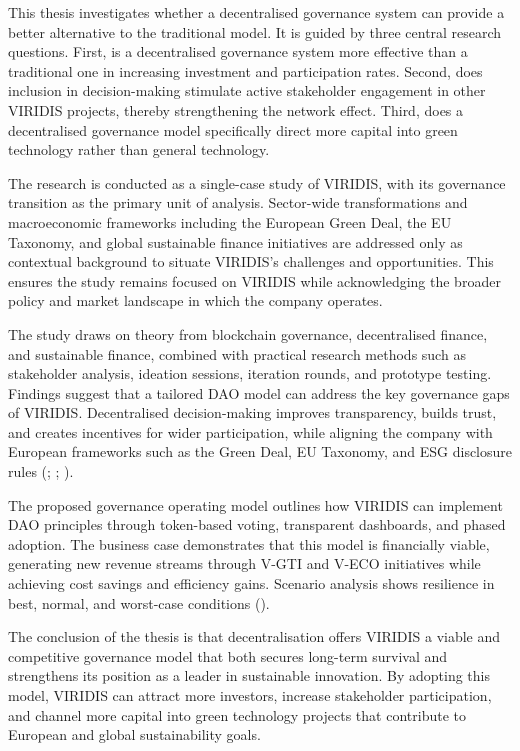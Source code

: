 \documentclass[
  english,
  12pt,
  oneside,
  open=any]{scrbook}
\begin{document}
This thesis investigates whether a decentralised governance system can
provide a better alternative to the traditional model. It is guided by
three central research questions. First, is a decentralised governance
system more effective than a traditional one in increasing investment
and participation rates. Second, does inclusion in decision-making
stimulate active stakeholder engagement in other VIRIDIS projects,
thereby strengthening the network effect. Third, does a decentralised
governance model specifically direct more capital into green technology
rather than general technology.

The research is conducted as a single-case study of VIRIDIS, with its
governance transition as the primary unit of analysis. Sector-wide
transformations and macroeconomic frameworks including the European
Green Deal, the EU Taxonomy, and global sustainable finance initiatives
are addressed only as contextual background to situate VIRIDIS's
challenges and opportunities. This ensures the study remains focused on
VIRIDIS while acknowledging the broader policy and market landscape in
which the company operates.

The study draws on theory from blockchain governance, decentralised
finance, and sustainable finance, combined with practical research
methods such as stakeholder analysis, ideation sessions, iteration
rounds, and prototype testing. Findings suggest that a tailored DAO
model can address the key governance gaps of VIRIDIS. Decentralised
decision-making improves transparency, builds trust, and creates
incentives for wider participation, while aligning the company with
European frameworks such as the Green Deal, EU Taxonomy, and ESG
disclosure rules (; ;
).

The proposed governance operating model outlines how VIRIDIS can
implement DAO principles through token-based voting, transparent
dashboards, and phased adoption. The business case demonstrates that
this model is financially viable, generating new revenue streams through
V-GTI and V-ECO initiatives while achieving cost savings and efficiency
gains. Scenario analysis shows resilience in best, normal, and
worst-case conditions
().

The conclusion of the thesis is that decentralisation offers VIRIDIS a
viable and competitive governance model that both secures long-term
survival and strengthens its position as a leader in sustainable
innovation. By adopting this model, VIRIDIS can attract more investors,
increase stakeholder participation, and channel more capital into green
technology projects that contribute to European and global
sustainability goals.
\end{document}
